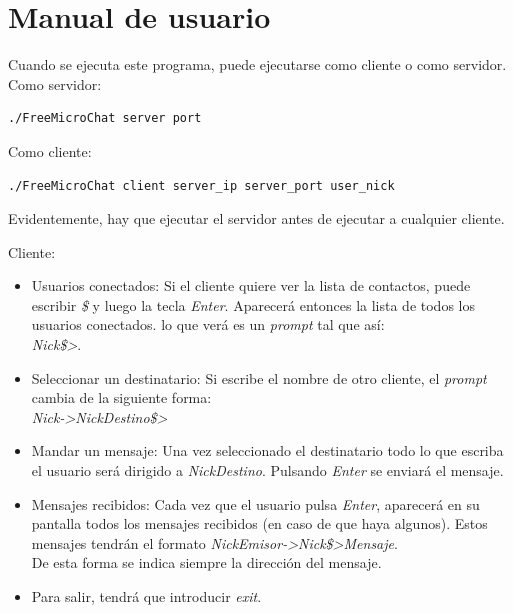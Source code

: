 \documentclass[a4paper,11pt,titlepage,halfparskip,cleardoubleempty]{scrbook}
\begin{document}
\section{Manual de usuario}

  Cuando se ejecuta este programa, puede ejecutarse como cliente o como servidor.\\

  Como servidor:
\begin{lstlisting}[style=C++]
    ./FreeMicroChat server port
\end{lstlisting}

Como cliente:
\begin{lstlisting}[style=C++]
      ./FreeMicroChat client server_ip server_port user_nick
\end{lstlisting}
  Evidentemente, hay que ejecutar el servidor antes de ejecutar a cualquier cliente.

Cliente:\\

\begin{itemize}
\item  Usuarios conectados: Si el cliente quiere ver la lista de contactos, puede escribir \textit{\$} y luego la tecla \textit{Enter}. Aparecerá entonces la lista de todos los usuarios conectados.
  lo que verá es un \textit{prompt} tal que así:\\
\textit{Nick\$>}.\\
\item Seleccionar un destinatario:
Si escribe el nombre de otro cliente, el \textit{prompt} cambia de la siguiente forma:\\
\textit{Nick->NickDestino\$>}
\item Mandar un mensaje: Una vez seleccionado el destinatario todo lo que escriba el usuario será dirigido a \textit{NickDestino}. Pulsando \textit{Enter} se enviará el mensaje.\\
\item Mensajes recibidos: Cada vez que el usuario pulsa \textit{Enter}, aparecerá en su pantalla todos los
  mensajes recibidos (en caso de que haya algunos). Estos mensajes tendrán el formato \textit{NickEmisor->Nick\$>Mensaje}.\\ De esta forma se indica siempre la dirección del mensaje.
\item Para salir, tendrá que introducir \textit{exit}.
\end{itemize}


%
%
%
\end{document}
